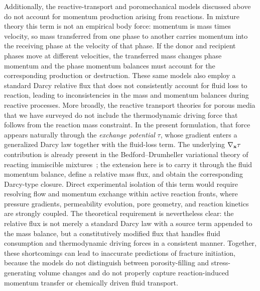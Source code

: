 \documentclass[11pt]{article}
\begin{document}
Additionally, the reactive-transport and poromechanical models discussed above do not account for momentum production arising from reactions. In mixture theory this term is not an empirical body force: momentum is mass times velocity, so mass transferred from one phase to another carries momentum into the receiving phase at the velocity of that phase. If the donor and recipient phases move at different velocities, the transferred mass changes phase momentum and the phase momentum balances must account for the corresponding production or destruction. These same models also employ a standard Darcy relative flux that does not consistently account for fluid loss to reaction, leading to inconsistencies in the mass and momentum balances during reactive processes. More broadly, the reactive transport theories for porous media that we have surveyed \cite{steefel2015rt} do not include the thermodynamic driving force that follows from the reaction mass constraint. In the present formulation, that force appears naturally through the \emph{exchange potential} $\tau$, whose gradient enters a generalized Darcy law together with the fluid-loss term. The underlying $\nabla_{\mathbf{x}}\tau$ contribution is already present in the Bedford--Drumheller variational theory of reacting immiscible mixtures~\cite{drumheller1980thermomechanical,drumheller2000}; the extension here is to carry it through the fluid momentum balance, define a relative mass flux, and obtain the corresponding Darcy-type closure. Direct experimental isolation of this term would require resolving flow and momentum exchange within active reaction fronts, where pressure gradients, permeability evolution, pore geometry, and reaction kinetics are strongly coupled. The theoretical requirement is nevertheless clear: the relative flux is not merely a standard Darcy law with a source term appended to the mass balance, but a constitutively modified flux that handles fluid consumption and thermodynamic driving forces in a consistent manner. Together, these shortcomings can lead to inaccurate predictions of fracture initiation, because the models do not distinguish between porosity-filling and stress-generating volume changes and do not properly capture reaction-induced momentum transfer or chemically driven fluid transport.
\end{document}
